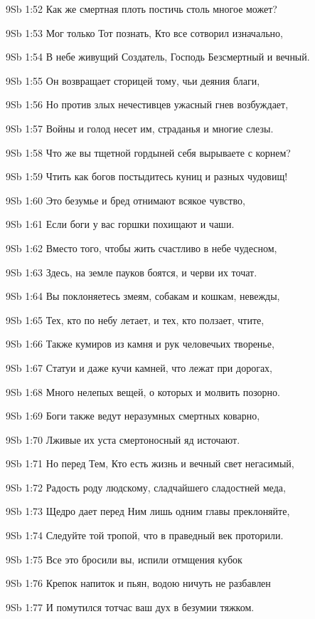 \vs 9Sb 1:52 Как же смертная плоть постичь столь многое может?

\vs 9Sb 1:53 Мог только Тот познать, Кто все сотворил изначально,

\vs 9Sb 1:54 В небе живущий Создатель, Господь Безсмертный и вечный.

\vs 9Sb 1:55 Он возвращает сторицей тому, чьи деяния благи,

\vs 9Sb 1:56 Но против злых нечестивцев ужасный гнев возбуждает,

\vs 9Sb 1:57 Войны и голод несет им, страданья и многие слезы.

\vs 9Sb 1:58 Что же вы тщетной гордыней себя вырываете с корнем?

\vs 9Sb 1:59 Чтить как богов постыдитесь куниц и разных чудовищ!

\vs 9Sb 1:60 Это безумье и бред отнимают всякое чувство,

\vs 9Sb 1:61 Если боги у вас горшки похищают и чаши.

\vs 9Sb 1:62 Вместо того, чтобы жить счастливо в небе чудесном,

\vs 9Sb 1:63 Здесь, на земле пауков боятся, и черви их точат.

\vs 9Sb 1:64 Вы поклоняетесь змеям, собакам и кошкам, невежды,

\vs 9Sb 1:65 Тех, кто по небу летает, и тех, кто ползает, чтите,

\vs 9Sb 1:66 Также кумиров из камня и рук человечьих творенье,

\vs 9Sb 1:67 Статуи и даже кучи камней, что лежат при дорогах, 

\vs 9Sb 1:68 Много нелепых вещей, о которых и молвить позорно.

\vs 9Sb 1:69 Боги также ведут неразумных смертных коварно,

\vs 9Sb 1:70 Лживые их уста смертоносный яд источают.

\vs 9Sb 1:71 Но перед Тем, Кто есть жизнь и вечный свет негасимый,

\vs 9Sb 1:72 Радость роду людскому, сладчайшего сладостней меда,

\vs 9Sb 1:73 Щедро дает  перед Ним лишь одним главы преклоняйте,

\vs 9Sb 1:74 Следуйте той тропой, что в праведный век проторили.

\vs 9Sb 1:75 Все это бросили вы, испили отмщения кубок 

\vs 9Sb 1:76 Крепок напиток и пьян, водою ничуть не разбавлен 

\vs 9Sb 1:77 И помутился тотчас ваш дух в безумии тяжком.

